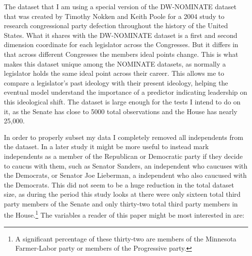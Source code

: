 \documentclass[12pt,twoside]{reedthesis}
\begin{document}
  The dataset that I am using a special version of the DW-NOMINATE dataset
  that was created by Timothy Nokken and Keith Poole for a 2004 study to
  research congressional party defection throughout the history of the
  United States. What it shares with the DW-NOMINATE dataset is a first
  and second dimension coordinate for each legislator across the
  Congresses. But it differs in that across different Congresses the
  members ideal points change. This is what makes this dataset unique
  among the NOMINATE datasets, as normally a legislator holds the same
  ideal point across their career. This allows me to compare a
  legislator's past ideology with their present ideology, helping the
  eventual model understand the importance of a predictor indicating
  leadership on this ideological shift. The dataset is large enough for
  the tests I intend to do on it, as the Senate has close to 5000 total
  observations and the House has nearly 25,000.
  
  In order to properly subset my data I completely removed all
  independents from the dataset. In a later study it might be more useful
  to instead mark independents as a member of the Republican or Democratic
  party if they decide to caucus with them, such as Senator Sanders, an
  independent who caucuses with the Democrats, or Senator Joe Lieberman, a
  independent who also caucused with the Democrats. This did not seem to
  be a huge reduction in the total dataset size, as during the period this
  study looks at there were only sixteen total third party members of the
  Senate and only thirty-two total third party members in the
  House.\footnote{A significant percentage of these thirty-two are members of the Minnesota Farmer-Labor party or members of the Progressive party.}
  The variables a reader of this paper might be most interested in are:
  
\end{document}
